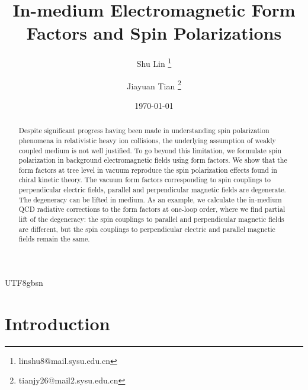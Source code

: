 \documentclass[11pt]{article}\def\baselinestretch{1.4}
\date{\today}
\begin{document}
\begin{CJK}{UTF8}{gbsn}

\title{\bf In-medium Electromagnetic Form Factors and Spin Polarizations}

\author[1]{{Shu Lin}
\thanks{linshu8@mail.sysu.edu.cn}}
\author[1]{{Jiayuan Tian}
\thanks{tianjy26@mail2.sysu.edu.cn}}

\maketitle


\begin{abstract}

Despite significant progress having been made in understanding spin polarization phenomena in relativistic heavy ion collisions, the underlying assumption of weakly coupled medium is not well justified. To go beyond this limitation, we formulate spin polarization in background electromagnetic fields using form factors. We show that the form factors at tree level in vacuum reproduce the spin polarization effects found in chiral kinetic theory. The vacuum form factors corresponding to spin couplings to perpendicular electric fields, parallel and perpendicular magnetic fields are degenerate. The degeneracy can be lifted in medium. As an example, we calculate the in-medium QCD radiative corrections to the form factors at one-loop order, where we find partial lift of the degeneracy: the spin couplings to parallel and perpendicular magnetic fields are different, but the spin couplings to perpendicular electric and parallel magnetic fields remain the same. 
\end{abstract}


\newpage

\section{Introduction}


\end{CJK}
\end{document}
